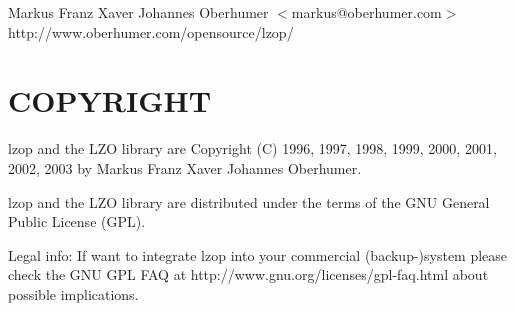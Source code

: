 Markus Franz Xaver Johannes Oberhumer
$<$markus@oberhumer.com$>$
http://www.oberhumer.com/opensource/lzop/

\section{COPYRIGHT\label{COPYRIGHT}}


lzop and the LZO library are
Copyright (C) 1996, 1997, 1998, 1999, 2000, 2001, 2002, 2003
by Markus Franz Xaver Johannes Oberhumer.



lzop and the LZO library are distributed under the terms
of the GNU General Public License (GPL).



Legal info: If want to integrate lzop into your commercial (backup-)system
please check the GNU GPL FAQ at http://www.gnu.org/licenses/gpl-faq.html
about possible implications.

